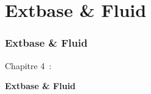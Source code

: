 %

\section{Extbase \& Fluid}
\begin{frame}[fragile]
	\frametitle{Extbase \& Fluid}

	\begin{center}\huge{Chapitre 4~:}\end{center}
	\begin{center}\huge{\color{typo3darkgrey}\textbf{Extbase \& Fluid}}\end{center}

\end{frame}


